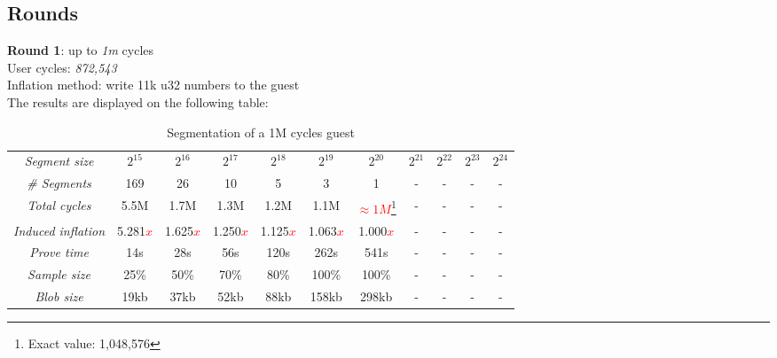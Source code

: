 \documentclass[a4paper, 10pt]{article}
\begin{document}
\subsection*{Rounds} 
\par \noindent
\textbf{Round 1}: up to \textit{1m} cycles\\
User cycles: \textit{872,543}\\
Inflation method: write 11k u32 numbers to the guest\\
The results are displayed on the following table:
\begin{table}[H]
  	\begin{center}
    \label{tab:table2}
    \begin{minipage}{\textwidth}
    \begin{adjustbox}{width=\textwidth}
    \begin{tabular}{c|c|c|c|c|c|c|c|c|c|c}
	  \textit{Segment size} & $2^{15}$ & $2^{16}$ & $2^{17}$ & $2^{18}$ & $2^{19}$ & $2^{20}$ & $2^{21}$ & $2^{22}$ & $2^{23}$ & $2^{24}$\\
	  \textit{\# Segments} & 169 & 26 & 10 & 5 & 3 & 1 & - & - & - & -\\
	  \textit{Total cycles} & 5.5M & 1.7M & 1.3M & 1.2M & 1.1M & \textcolor{red}{$\approx 1M$}\footnote{Exact value: 1,048,576}  & - & - & - & -\\
	  \textit{Induced inflation} & 5.281\textcolor{red}{$x$} & 1.625\textcolor{red}{$x$} & 1.250\textcolor{red}{$x$} & 1.125\textcolor{red}{$x$} & 1.063\textcolor{red}{$x$} & 1.000\textcolor{red}{$x$} & - & - & - & -\\
	  \textit{Prove time} & 14s & 28s & 56s & 120s & 262s & 541s & - & - & - & -\\
	  \textit{Sample size} & 25\% & 50\% & 70\% & 80\% & 100\% & 100\% & - & - & - & -\\
	  \textit{Blob size} & 19kb & 37kb & 52kb & 88kb &158kb & 298kb & - & - & - & -\\
   	\end{tabular}
   	\end{adjustbox}
   	\end{minipage}
    \caption{Segmentation of a 1M cycles guest}
  \end{center}
\end{table}
\end{document}
